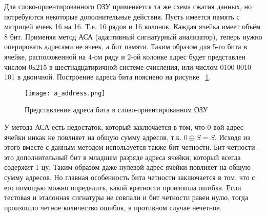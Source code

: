 Для слово-ориентированного ОЗУ применяется та же схема сжатия данных, но потребуются некоторые дополнительные действия. Пусть имеется память с матрицей ячеек 16 на 16. Т.е. 16 рядов и 16 колонок. Каждая ячейка имеет объём 8 бит. Применяя метод АСА (адаптивный сигнатурный анализатор), теперь нужно оперировать адресами не ячеек, а бит памяти. Таким образом для 5-го бита в ячейке, расположенной на 4-ом ряду и 2-ой колонке адрес будет представлен числом  0x215 в шестнадцатиричной системе счисления, или числом 0100 0010 101 в двоичной. Построение адреса бита пояснено на рисунке ~\ref{fig:arch_and_mod:memory_refresh:address}.

\begin{figure}[ht]
\centering
  \texttt{[image: a\_address.png]}  
  \caption{Представление адреса бита в слово-ориентированном ОЗУ}
  \label{fig:arch_and_mod:memory_refresh:address}
\end{figure}

У метода АСА есть недостаток, который заключается в том, что 0-вой адрес ячейки никак не повлияет на общую сумму адресов, т.к. $0 \oplus S = S$. Исходя из этого вместе с данным методом используется также бит четности\cite{March_Tests_Ivaniuk}. Бит четности - это дополнительный бит в младшем разряде адреса ячейки, который всегда содержит 1-цу. Таким образом даже нулевой адрес ячейки повлияет на общую сумму адресов. Но главная особенность бита четности заключается в том, что с его помощью можно определить, какой кратности произошла ошибка. Если тестовая и эталонная сигнатуры не совпали и бит четности равен нулю, тогда произошло четное количество ошибок, в противном случае нечетное.

